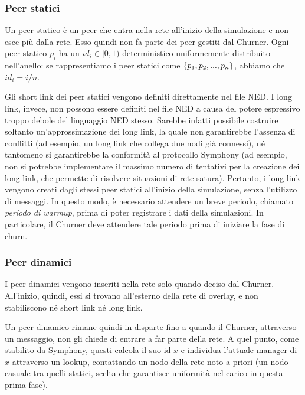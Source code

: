 \documentclass[prodmode,acmtap]{acmlarge}
\begin{document}
\subsubsection*{Peer statici}
Un peer statico è un peer che entra nella rete all'inizio della simulazione e non esce più dalla rete. Esso quindi non fa parte dei peer gestiti dal Churner. Ogni peer statico $p_i$ ha un $id_i \in [0,1)$ deterministico uniformemente distribuito nell'anello: se rappresentiamo i peer statici come $\{p_1, \linebreak[1] p_2, \linebreak[1] ..., \linebreak[1] p_n\}$, abbiamo che $id_i = i / n$.

Gli short link dei peer statici vengono definiti direttamente nel file NED. I long link, invece, non possono essere definiti nel file NED a causa del potere espressivo troppo debole del linguaggio NED stesso. Sarebbe infatti possibile costruire soltanto un'approssimazione dei long link, la quale non garantirebbe l'assenza di conflitti (ad esempio, un long link che collega due nodi già connessi), né tantomeno si garantirebbe la conformità al protocollo Symphony (ad esempio, non si potrebbe implementare il massimo numero di tentativi per la creazione dei long link, che permette di risolvere situazioni di rete satura). Pertanto, i long link vengono creati dagli stessi peer statici all'inizio della simulazione, senza l'utilizzo di messaggi. In questo modo, è necessario attendere un breve periodo, chiamato \textit{periodo di warmup}, prima di poter registrare i dati della simulazioni. In particolare, il Churner deve attendere tale periodo prima di iniziare la fase di churn.

\subsubsection*{Peer dinamici}
I peer dinamici vengono inseriti nella rete solo quando deciso dal Churner. All'inizio, quindi, essi si trovano all'esterno della rete di overlay, e non stabiliscono né short link né long link.

Un peer dinamico rimane quindi in disparte fino a quando il Churner, attraverso un messaggio, non gli chiede di entrare a far parte della rete. A quel punto, come stabilito da Symphony, questi calcola il suo id $x$ e individua l'attuale manager di $x$ attraverso un lookup, contattando un nodo della rete noto a priori (un nodo casuale tra quelli statici, scelta che garantisce uniformità nel carico in questa prima fase).
\end{document}

